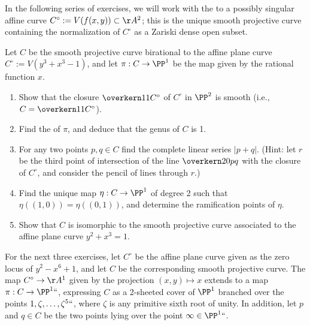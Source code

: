 In the following series of exercises, we will work with the
to a possibly 
%
singular affine curve
%
$C^\circ := V(f(x,y)) \subset \AA^2$; this is the unique smooth
projective curve containing the normalization of $C^\circ$ as a
Zariski dense open subset.

\begin{exercise}
\def\ovCcirc{\overkern11{C^\circ}}
Let $C$ be the smooth projective curve birational to the affine plane curve $C^\circ := V(y^3 +x^3 - 1)$, and let $\pi : C \to \PP^1$ be the map given by the rational function $x$.
\begin{enumerate}
\item Show that the closure $\ovCcirc$ of $C^\circ$ in $\PP^2$ is smooth (i.e., $C = \ovCcirc$). 
\item Find the 
%
%
of $\pi$, and deduce that the genus of $C$ is 1.
\item For any two points $p, q \in C$ find the complete linear series
  $|p+q|$. (Hint: let $r$ be the third point of intersection of the
  line $\overkern20{pq}$ with the closure of $C^\circ$, and consider the
  pencil of lines through $r$.) 
\item Find the unique 
map $\eta : C \to \PP^1$ of degree 2 such that $\eta((1,0)) = \eta((0,1))$, 
and determine the ramification points of $\eta$.
\item Show that $C$ is isomorphic to the smooth projective curve associated to the affine plane curve $y^2 +x^3 = 1$.
\end{enumerate}
\end{exercise}

For the next three exercises, let $C^\circ$ be the affine plane curve
given as the zero locus of $y^2 - x^6 +1$, and let $C$ be the
corresponding smooth projective curve. 
The map $C^\circ \to
\AA^1$ given by the projection $(x,y) \mapsto x$ extends to a map $\pi
: C \to \PP^1` `$, expressing $C$ as a 2-sheeted cover of $\PP^1$
branched over the points $1, \zeta, \dots, \zeta^5` `$, where $\zeta$
is any primitive sixth root of unity. In addition, let $p$ and $q \in
C$ be the two points lying over the point $\infty \in \PP^1` `$.


